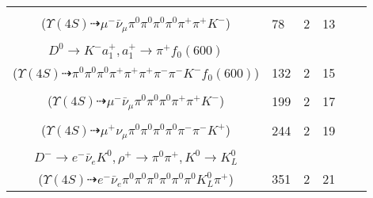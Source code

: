 \documentclass[landscape]{article}
\newcounter{rownumbers}
\newcommand\rn{\stepcounter{rownumbers}\arabic{rownumbers}}
\newcommand{\EOLP}{\\ \hline} %
\newcommand{\topoTags}[1]{#1} %
\begin{document}
\begin{longtable}{clcccc}
\rn & \makecell[l]{ $ 
\Upsilon(4S) \rightarrow B^{0} \bar{B}^{0} ,
B^{0} \rightarrow \pi^{0} \bar{D}^{0} ,
\bar{B}^{0} \rightarrow \mu^{-} \bar{\nu}_{\mu} D^{*+} ,
\bar{D}^{0} \rightarrow \pi^{0} \pi^{0} ,
D^{*+} \rightarrow \pi^{0} D^{+} ,
D^{+} \rightarrow \pi^{+} \pi^{+} K^{-} 
$ \\ ($
\Upsilon(4S) \dashrightarrow \mu^{-} \bar{\nu}_{\mu} \pi^{0} \pi^{0} \pi^{0} \pi^{0} \pi^{+} \pi^{+} K^{-} 
$) } & \topoTags{78 & }2 & 13 \EOLP

\rn & \makecell[l]{ $ 
\Upsilon(4S) \rightarrow B^{0} \bar{B}^{0} ,
B^{0} \rightarrow \pi^{0} \bar{D}^{0} ,
\bar{B}^{0} \rightarrow \rho^{0} \pi^{-} D^{*+} ,
\bar{D}^{0} \rightarrow \pi^{0} \pi^{0} ,
\rho^{0} \rightarrow \pi^{+} \pi^{-} ,
D^{*+} \rightarrow \pi^{+} D^{0} ,
$ \\ $
D^{0} \rightarrow K^{-} a_{1}^{+} ,
a_{1}^{+} \rightarrow \pi^{+} f_{0}(600) 
$ \\ ($
\Upsilon(4S) \dashrightarrow \pi^{0} \pi^{0} \pi^{0} \pi^{+} \pi^{+} \pi^{+} \pi^{-} \pi^{-} K^{-} f_{0}(600) 
$) } & \topoTags{132 & }2 & 15 \EOLP

\rn & \makecell[l]{ $ 
\Upsilon(4S) \rightarrow B^{0} \bar{B}^{0} ,
B^{0} \rightarrow \pi^{0} \bar{D}^{0} ,
\bar{B}^{0} \rightarrow \mu^{-} \bar{\nu}_{\mu} D^{+} ,
\bar{D}^{0} \rightarrow \pi^{0} \pi^{0} ,
D^{+} \rightarrow \pi^{+} \pi^{+} K^{-} 
$ \\ ($
\Upsilon(4S) \dashrightarrow \mu^{-} \bar{\nu}_{\mu} \pi^{0} \pi^{0} \pi^{0} \pi^{+} \pi^{+} K^{-} 
$) } & \topoTags{199 & }2 & 17 \EOLP

\rn & \makecell[l]{ $ 
\Upsilon(4S) \rightarrow B^{0} \bar{B}^{0} ,
B^{0} \rightarrow \mu^{+} \nu_{\mu} D^{*-} ,
\bar{B}^{0} \rightarrow \pi^{0} D^{0} ,
D^{*-} \rightarrow \pi^{-} \bar{D}^{0} ,
D^{0} \rightarrow \pi^{0} \pi^{0} ,
\bar{D}^{0} \rightarrow \pi^{0} \pi^{-} K^{+} 
$ \\ ($
\Upsilon(4S) \dashrightarrow \mu^{+} \nu_{\mu} \pi^{0} \pi^{0} \pi^{0} \pi^{0} \pi^{-} \pi^{-} K^{+} 
$) } & \topoTags{244 & }2 & 19 \EOLP

\rn & \makecell[l]{ $ 
\Upsilon(4S) \rightarrow B^{0} \bar{B}^{0} ,
B^{0} \rightarrow D^{*-} a_{1}^{+} ,
\bar{B}^{0} \rightarrow \pi^{0} D^{0} ,
D^{*-} \rightarrow \pi^{0} D^{-} ,
a_{1}^{+} \rightarrow \pi^{0} \rho^{+} ,
D^{0} \rightarrow \pi^{0} \pi^{0} ,
$ \\ $
D^{-} \rightarrow e^{-} \bar{\nu}_{e} K^{0} ,
\rho^{+} \rightarrow \pi^{0} \pi^{+} ,
K^{0} \rightarrow K_{L}^{0} 
$ \\ ($
\Upsilon(4S) \dashrightarrow e^{-} \bar{\nu}_{e} \pi^{0} \pi^{0} \pi^{0} \pi^{0} \pi^{0} \pi^{0} K_{L}^{0} \pi^{+} 
$) } & \topoTags{351 & }2 & 21 \EOLP


\end{longtable}
\end{document}
